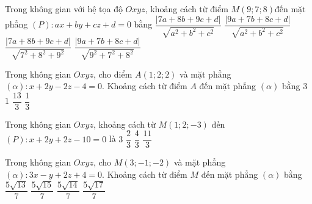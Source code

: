 

\begin{ex}%
	Trong không gian với hệ tọa độ $Oxyz$,  khoảng cách từ điểm $M(9;7;8)$đến mặt phẳng $(P)\colon ax+by+cz+d=0$ bằng
	\choice 
		{$\dfrac{|7a+8b+9c+d|}{\sqrt{a^2+b^2+c^2}}$} 
		{\True $\dfrac{|9a+7b+8c+d|}{\sqrt{a^2+b^2+c^2}}$} 
		{$\dfrac{|7a+8b+9c+d|}{\sqrt{7^2+8^2+9^2}}$} 
		{$\dfrac{|9a+7b+8c+d|}{\sqrt{9^2+7^2+8^2}}$} 
\end{ex}

\begin{ex}%
	Trong không gian $Oxyz$, cho điểm $A(1; 2; 2)$ và mặt phẳng  $(\alpha)\colon x+2y-2z-4=0$. Khoảng cách từ điểm $A$ đến mặt phẳng $(\alpha)$ bằng
	\choice 
		 {$3$}
		 {\True $1$}
		{$\dfrac{13}{3}$} 
		 {$\dfrac{1}{3}$}
\end{ex}

\begin{ex}%
	Trong không gian $Oxyz$, khoảng cách từ $M(1;2;-3)$ đến  $(P)\colon x+2y+2z-10=0$ là
	\choice 
		 {$3$}
		 {$\dfrac{2}{3}$}
		{$\dfrac{4}{3}$} 
		{\True  $\dfrac{11}{3}$}
\end{ex}

\begin{ex}%
	Trong không gian $Oxyz$, cho $M(3;-1;-2)$ và mặt phẳng $(\alpha)\colon 3x-y+2z+4=0$. Khoảng cách từ điểm $M$ đến mặt phẳng $(\alpha)$ bằng 
	 \choice
		{$\dfrac{5\sqrt{13}}{7}$} 
		 {$\dfrac{5\sqrt{15}}{7}$}
		{\True  $\dfrac{5\sqrt{14}}{7}$}
		{$\dfrac{5\sqrt{17}}{7}$} 
\end{ex}


